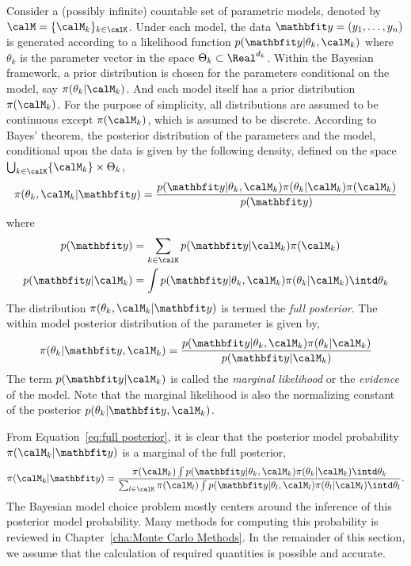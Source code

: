 Consider a (possibly infinite) countable set of parametric models, denoted by
$\calM = \{\calM_k\}_{k\in\calK}$. Under each model, the data $\data =
(y_1,\dots,y_n)$ is generated according to a likelihood function
$p(\data|\theta_k,\calM_k)$ where $\theta_k$ is the parameter vector in the
space $\Theta_k\subset\Real^{d_k}$. Within the Bayesian framework, a prior
distribution is chosen for the parameters conditional on the model, say
$\pi(\theta_k|\calM_k)$. And each model itself has a prior distribution
$\pi(\calM_k)$. For the purpose of simplicity, all distributions are assumed
to be continuous except $\pi(\calM_k)$, which is assumed to be discrete.
According to Bayes' theorem, the posterior distribution of the parameters and
the model, conditional upon the data is given by the following density,
defined on the space $\bigcup_{k\in\calK}\{\calM_k\}\times\Theta_k$,
\begin{equation}
  \pi(\theta_k,\calM_k|\data) =
  \frac{p(\data|\theta_k,\calM_k)\pi(\theta_k|\calM_k)\pi(\calM_k)}{p(\data)}
  \label{eq:full posterior}
\end{equation}
where
\begin{align}
  p(\data) &= \sum_{k\in\calK}p(\data|\calM_k)\pi(\calM_k) \\
  p(\data|\calM_k) &=
  \int p(\data|\theta_k,\calM_k)\pi(\theta_k|\calM_k)\intd\theta_k
  \label{eq:marginal likelihood}
\end{align}
The distribution $\pi(\theta_k,\calM_k|\data)$ is termed the \emph{full
  posterior}. The within model posterior distribution of the parameter is
given by,
\begin{equation}
  \pi(\theta_k|\data,\calM_k) =
  \frac{p(\data|\theta_k,\calM_k)\pi(\theta_k|\calM_k)}{p(\data|\calM_k)}
  \label{eq:within posterior}
\end{equation}
The term $p(\data|\calM_k)$ is called the \emph{marginal likelihood} or the
\emph{evidence} of the model. Note that the marginal likelihood is also the
normalizing constant of the posterior $p(\theta_k|\data,\calM_k)$.

From Equation~\eqref{eq:full posterior}, it is clear that the posterior model
probability $\pi(\calM_k|\data)$ is a marginal of the full posterior,
\begin{equation}
  \pi(\calM_k|\data) =
  \frac{
    \pi(\calM_k)
    \int p(\data|\theta_k,\calM_k)\pi(\theta_k|\calM_k)\intd\theta_k
  }{
    \sum_{l\in\calK}\pi(\calM_l)
    \int p(\data|\theta_l,\calM_l)\pi(\theta_l|\calM_l)\intd\theta_l
  }.
  \label{eq:post model prob}
\end{equation}
The Bayesian model choice problem mostly centers around the inference of this
posterior model probability. Many methods for computing this probability is
reviewed in Chapter~\ref{cha:Monte Carlo Methods}. In the remainder of this
section, we assume that the calculation of required quantities is possible and
accurate.


